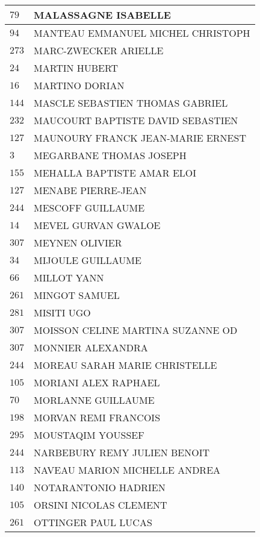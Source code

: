 \begin{xltabular}{\linewidth}{|l|X|}
    \hline
    $79$ & MALASSAGNE ISABELLE \\
    \hline
    $94$ & MANTEAU EMMANUEL MICHEL CHRISTOPH \\
    \hline
    $273$ & MARC-ZWECKER ARIELLE \\
    \hline
    $24$ & MARTIN HUBERT \\
    \hline
    $16$ & MARTINO DORIAN \\
    \hline
    $144$ & MASCLE SEBASTIEN THOMAS GABRIEL \\
    \hline
    $232$ & MAUCOURT BAPTISTE DAVID SEBASTIEN \\
    \hline
    $127$ & MAUNOURY FRANCK JEAN-MARIE ERNEST \\
    \hline
    $3$ & MEGARBANE THOMAS JOSEPH \\
    \hline
    $155$ & MEHALLA BAPTISTE AMAR ELOI \\
    \hline
    $127$ & MENABE PIERRE-JEAN \\
    \hline
    $244$ & MESCOFF GUILLAUME \\
    \hline
    $14$ & MEVEL GURVAN GWALOE \\
    \hline
    $307$ & MEYNEN OLIVIER \\
    \hline
    $34$ & MIJOULE GUILLAUME \\
    \hline
    $66$ & MILLOT YANN \\
    \hline
    $261$ & MINGOT SAMUEL \\
    \hline
    $281$ & MISITI UGO \\
    \hline
    $307$ & MOISSON CELINE MARTINA SUZANNE OD \\
    \hline
    $307$ & MONNIER ALEXANDRA \\
    \hline
    $244$ & MOREAU SARAH MARIE CHRISTELLE \\
    \hline
    $105$ & MORIANI ALEX RAPHAEL \\
    \hline
    $70$ & MORLANNE GUILLAUME \\
    \hline
    $198$ & MORVAN REMI FRANCOIS \\
    \hline
    $295$ & MOUSTAQIM YOUSSEF \\
    \hline
    $244$ & NARBEBURY REMY JULIEN BENOIT \\
    \hline
    $113$ & NAVEAU MARION MICHELLE ANDREA \\
    \hline
    $140$ & NOTARANTONIO HADRIEN \\
    \hline
    $105$ & ORSINI NICOLAS CLEMENT \\
    \hline
    $261$ & OTTINGER PAUL LUCAS \\

\end{xltabular}
